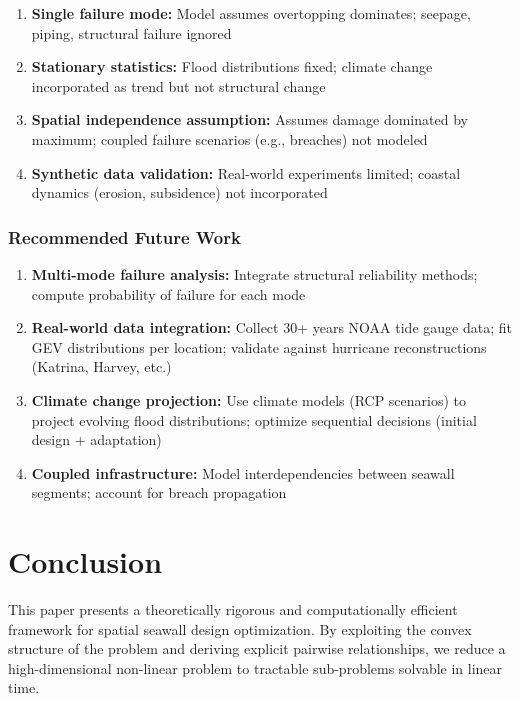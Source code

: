 \documentclass[3p,twocolumn]{elsarticle}
\begin{document}
\begin{enumerate}
  \item \textbf{Single failure mode:} Model assumes overtopping dominates; seepage, piping, structural failure ignored

  \item \textbf{Stationary statistics:} Flood distributions fixed; climate change incorporated as trend but not structural change

  \item \textbf{Spatial independence assumption:} Assumes damage dominated by maximum; coupled failure scenarios (e.g., breaches) not modeled

  \item \textbf{Synthetic data validation:} Real-world experiments limited; coastal dynamics (erosion, subsidence) not incorporated
\end{enumerate}

\subsubsection{Recommended Future Work}

\begin{enumerate}
  \item \textbf{Multi-mode failure analysis:} Integrate structural reliability methods; compute probability of failure for each mode

  \item \textbf{Real-world data integration:} Collect 30+ years NOAA tide gauge data; fit GEV distributions per location; validate against hurricane reconstructions (Katrina, Harvey, etc.)

  \item \textbf{Climate change projection:} Use climate models (RCP scenarios) to project evolving flood distributions; optimize sequential decisions (initial design + adaptation)

  \item \textbf{Coupled infrastructure:} Model interdependencies between seawall segments; account for breach propagation
\end{enumerate}

\section{Conclusion}

This paper presents a theoretically rigorous and computationally efficient framework for spatial seawall design optimization. By exploiting the convex structure of the problem and deriving explicit pairwise relationships, we reduce a high-dimensional non-linear problem to tractable sub-problems solvable in linear time.
\end{document}
